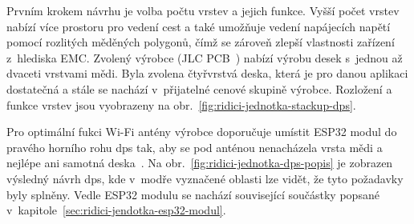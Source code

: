         Prvním krokem návrhu je volba počtu vrstev a jejich funkce. Vyšší počet vrstev nabízí více prostoru pro vedení cest a také umožňuje vedení napájecích napětí pomocí rozlitých měděných polygonů, čímž se zároveň zlepší vlastnosti zařízení z~hlediska \acs{EMC}. Zvolený výrobce (JLC PCB~\cite{jlcpcb}) nabízí výrobu desek s~jednou až dvaceti vrstvami mědi. Byla zvolena čtyřvrstvá deska, která je pro danou aplikaci dostatečná a stále se nachází v~přijatelné cenové skupině výrobce. Rozložení a funkce vrstev jsou vyobrazeny na obr.~\ref{fig:ridici-jednotka-stackup-dps}.

        Pro optimální fukci Wi-Fi antény výrobce doporučuje umístit ESP32 modul do pravého horního rohu \acs{dps} tak, aby se pod anténou nenacházela vrsta mědi a nejlépe ani samotná deska~\cite{esp32-hw-guidelines}. Na obr.~\ref{fig:ridici-jednotka-dps-popis} je zobrazen výsledný návrh \acs{dps}, kde v~modře vyznačené oblasti lze vidět, že tyto požadavky byly splněny. Vedle ESP32 modulu se nachází související součástky popsané v~kapitole~\ref{sec:ridici-jendotka-esp32-modul}.

